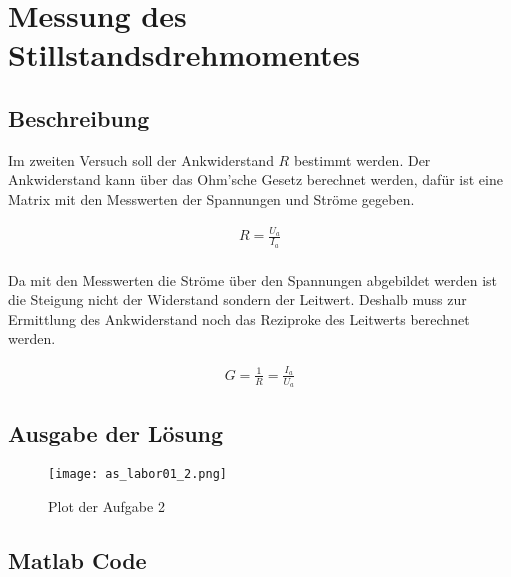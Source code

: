 \section{Messung des Stillstandsdrehmomentes}

\subsection{Beschreibung}

Im zweiten Versuch soll der Ankwiderstand $R$ bestimmt werden.
Der Ankwiderstand kann über das Ohm'sche Gesetz berechnet werden,
dafür ist eine Matrix mit den Messwerten der Spannungen und Ströme gegeben.

\begin{equation} \label{eq2}
    \begin{split}
        R=\frac{U_a}{I_a}\\
    \end{split}
\end{equation}

Da mit den Messwerten die Ströme über den Spannungen abgebildet werden ist die
Steigung nicht der Widerstand sondern der Leitwert. Deshalb muss zur Ermittlung
des Ankwiderstand noch das Reziproke des Leitwerts berechnet werden.

\begin{equation} \label{eq2}
    \begin{split}
        G=\frac{1}{R}=\frac{I_a}{U_a}
    \end{split}
\end{equation}



\subsection{Ausgabe der Lösung}
\begin{figure}[H]
 \centering
 \texttt{[image: as\_labor01\_2.png]}
 \caption{Plot der Aufgabe 2}
 \label{fig:PlotAufgabe2}
\end{figure}

\subsection{Matlab Code}

